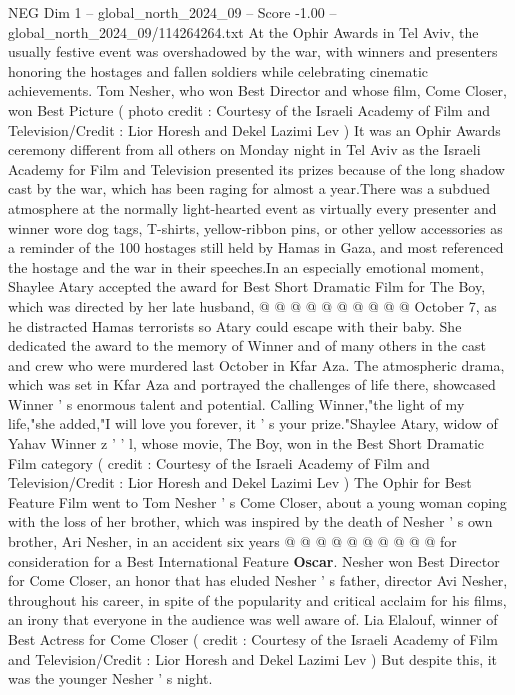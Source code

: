 \begin{textsample}{NEG Dim 1 – global\_north\_2024\_09 – Score -1.00 – global\_north\_2024\_09/114264264.txt}  \label{ex:f1_neg_358}
At the Ophir Awards in Tel Aviv, the usually festive event was overshadowed by the war, with winners and presenters honoring the hostages and fallen soldiers while celebrating cinematic achievements.
Tom Nesher, who won Best Director and whose film, Come Closer, won Best Picture ( photo credit : Courtesy of the Israeli Academy of Film and Television/Credit : Lior Horesh and Dekel Lazimi Lev ) It was an Ophir Awards ceremony different from all others on Monday night in Tel Aviv as the Israeli Academy for Film and Television presented its prizes because of the long shadow cast by the war, which has been raging for almost a year.There was a subdued atmosphere at the normally light-hearted event as virtually every presenter and winner wore dog tags, T-shirts, yellow-ribbon pins, or other yellow accessories as a reminder of the 100 hostages still held by Hamas in Gaza, and most referenced the hostage and the war in their speeches.In an especially emotional moment, Shaylee Atary accepted the award for Best Short Dramatic Film for The Boy, which was directed by her late husband, @ @ @ @ @ @ @ @ @ @ October 7, as he distracted Hamas terrorists so Atary could escape with their baby.
She dedicated the award to the memory of Winner and of many others in the cast and crew who were murdered last October in Kfar Aza.
The atmospheric drama, which was set in Kfar Aza and portrayed the challenges of life there, showcased Winner ' s enormous talent and potential.
Calling Winner,"the light of my life,"she added,"I will love you forever, it ' s your prize."Shaylee Atary, widow of Yahav Winner z ' ' l, whose movie, The Boy, won in the Best Short Dramatic Film category ( credit : Courtesy of the Israeli Academy of Film and Television/Credit : Lior Horesh and Dekel Lazimi Lev ) The Ophir for Best Feature Film went to Tom Nesher ' s Come Closer, about a young woman coping with the loss of her brother, which was inspired by the death of Nesher ' s own brother, Ari Nesher, in an accident six years @ @ @ @ @ @ @ @ @ @ for consideration for a Best International Feature \textbf{Oscar}.
Nesher won Best Director for Come Closer, an honor that has eluded Nesher ' s father, director Avi Nesher, throughout his career, in spite of the popularity and critical acclaim for his films, an irony that everyone in the audience was well aware of.
Lia Elalouf, winner of Best Actress for Come Closer ( credit : Courtesy of the Israeli Academy of Film and Television/Credit : Lior Horesh and Dekel Lazimi Lev ) But despite this, it was the younger Nesher ' s night.

\end{textsample}
